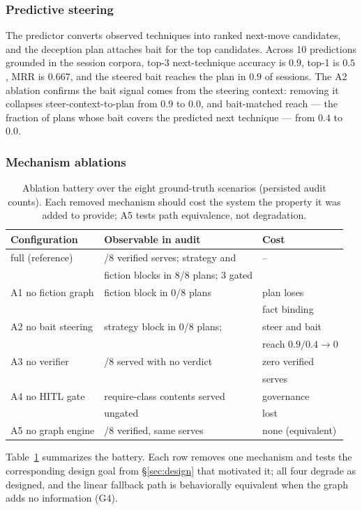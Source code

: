\subsubsection{Predictive steering}
The \attck predictor converts observed techniques into ranked next-move
candidates, and the deception plan attaches bait for the top candidates.
Across 10 predictions grounded in the session corpora, top-3 next-technique
accuracy is $0.9$, top-1 is $0.5$, MRR is $0.667$, and the
steered bait reaches the plan in $0.9$ of sessions. The A2 ablation
confirms the bait signal comes from the steering context: removing it
collapses steer-context-to-plan from $0.9$ to $0.0$, and bait-matched
reach --- the fraction of plans whose bait covers the predicted next
technique --- from $0.4$ to $0.0$.

\subsubsection{Mechanism ablations}
\begin{table}[t]
\centering
\caption{Ablation battery over the eight ground-truth scenarios
(persisted audit counts). Each removed mechanism should cost the system
the property it was added to provide; A5 tests path equivalence, not
degradation.}
\label{tab:ablations}
\small
\setlength{\tabcolsep}{4pt}
\begin{tabular}{>{\raggedright\arraybackslash}p{2.4cm}>{\raggedright\arraybackslash}p{3.3cm}>{\raggedright\arraybackslash}p{1.9cm}}
\toprule
Configuration & Observable in audit & Cost \\
\midrule
full (reference) & 8/8 verified serves; strategy and & -- \\
 & fiction blocks in 8/8 plans; 3 gated & \\
A1 no fiction graph & fiction block in 0/8 plans & plan loses \\
 & & fact binding \\
A2 no bait steering & strategy block in 0/8 plans; & steer and bait \\
 & & reach $0.9/0.4 \to 0$ \\
A3 no verifier & 8/8 served with no verdict & zero verified \\
 & & serves \\
A4 no HITL gate & 3 require-class contents served & governance \\
 & ungated & lost \\
A5 no graph engine & 8/8 verified, same serves & none (equivalent) \\
\bottomrule
\end{tabular}
\end{table}
Table~\ref{tab:ablations} summarizes the battery. Each row removes one
mechanism and tests the corresponding design goal from
\S\ref{sec:design} that motivated it;
all four degrade as designed, and the linear fallback
path is behaviorally equivalent when the graph adds no information (G4).

